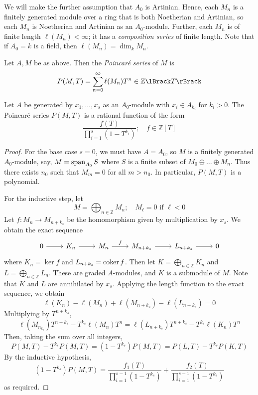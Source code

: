 We will make the further assumption that \( A_0 \) is Artinian.
Hence, each \( M_n \) is a finitely generated module over a ring that is both Noetherian and Artinian, so each \( M_n \) is Noetherian and Artinian as an \( A_0 \)-module.
Further, each \( M_n \) is of finite length \( \ell(M_n) < \infty \); it has a \emph{composition series} of finite length.
Note that if \( A_0 = k \) is a field, then \( \ell(M_n) = \dim_k M_n \).
\begin{definition}
    Let \( A, M \) be as above.
    Then the \emph{Poincar\'e series} of \( M \) is
    \[ P(M, T) = \sum_{n=0}^\infty \ell(M_n) T^n \in \mathbb Z\Brackets{T} \]
\end{definition}
\begin{theorem}
    Let \( A \) be generated by \( x_1, \dots, x_s \) as an \( A_0 \)-module with \( x_i \in A_{k_i} \) for \( k_i > 0 \).
    The Poincar\'e series \( P(M, T) \) is a rational function of the form
    \[ \frac{f(T)}{\prod_{i=1}^s (1 - T^{k_i})};\quad f \in \mathbb Z[T] \]
\end{theorem}
\begin{proof}
    For the base case \( s = 0 \), we must have \( A = A_0 \), so \( M \) is a finitely generated \( A_0 \)-module, say, \( M = \operatorname{span}_{A_0} S \) where \( S \) is a finite subset of \( M_0 \oplus \dots \oplus M_n \).
    Thus there exists \( n_0 \) such that \( M_m = 0 \) for all \( m > n_0 \).
    In particular, \( P(M, T) \) is a polynomial.

    For the inductive step, let
    \[ M = \bigoplus_{n \in \mathbb Z} M_n;\quad M_\ell = 0 \text{ if } \ell < 0 \]
    Let \( f : M_n \to M_{n+k_s} \) be the homomorphism given by multiplication by \( x_s \).
    We obtain the exact sequence
\[\begin{tikzcd}
	0 & {K_n} & {M_n} & {M_{n+k_s}} & {L_{n+k_s}} & 0
	\arrow["f", from=1-3, to=1-4]
	\arrow[from=1-4, to=1-5]
	\arrow[from=1-5, to=1-6]
	\arrow[from=1-1, to=1-2]
	\arrow[from=1-2, to=1-3]
\end{tikzcd}\]
    where \( K_n = \ker f \) and \( L_{n+k_s} = \operatorname{coker} f \).
    Then let \( K = \bigoplus_{n \in \mathbb Z} K_n \) and \( L = \bigoplus_{n \in \mathbb Z} L_n \).
    These are graded \( A \)-modules, and \( K \) is a submodule of \( M \).
    Note that \( K \) and \( L \) are annihilated by \( x_s \).
    Applying the length function to the exact sequence, we obtain
    \[ \ell(K_n) - \ell(M_n) + \ell(M_{n+k_s}) - \ell(L_{n+k_s}) = 0 \]
    Multiplying by \( T^{n+k_s} \),
    \[ \ell(M_{n_k_s}) T^{n+k_s} - T^{k_s}\ell(M_n) T^n = \ell(L_{n+k_s}) T^{n+k_s} - T^{k_s}\ell(K_n) T^n \]
    Then, taking the sum over all integers,
    \[ P(M, T) - T^{k_s} P(M, T) = (1 - T^{k_s}) P(M, T) = P(L, T) - T^{k_s} P(K, T) \]
    By the inductive hypothesis,
    \[ (1 - T^{k_s}) P(M, T) = \frac{f_1(T)}{\prod_{i=1}^{s-1} (1 - T^{k_s})} + \frac{f_2(T)}{\prod_{i=1}^{s-1} (1 - T^{k_s})} \]
    as required.
\end{proof}
